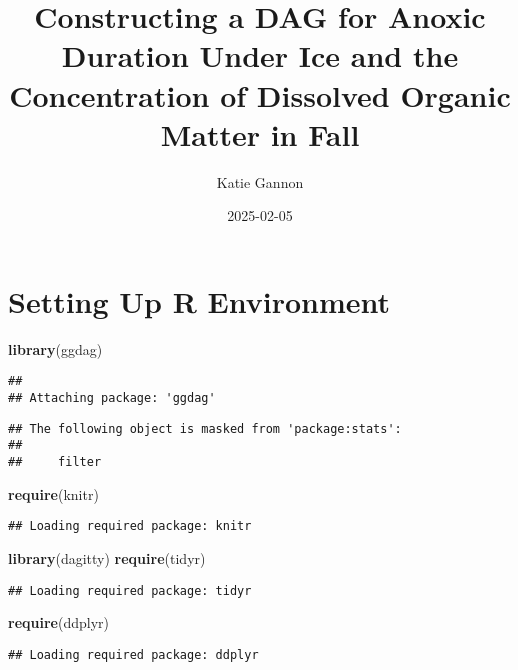 \documentclass[]{article}
\title{Constructing a DAG for Anoxic Duration Under Ice and the Concentration
of Dissolved Organic Matter in Fall}
\author{Katie Gannon}
\date{2025-02-05}
\newenvironment{Shaded}{\begin{snugshade}}{\end{snugshade}}
\newcommand{\KeywordTok}[1]{\textcolor[rgb]{0.13,0.29,0.53}{\textbf{#1}}}
\newcommand{\NormalTok}[1]{#1}
\begin{document}
\maketitle

\hypertarget{setting-up-r-environment}{%
\section{Setting Up R Environment}\label{setting-up-r-environment}}

\begin{Shaded}
\begin{Highlighting}[]
\KeywordTok{library}\NormalTok{(ggdag)}
\end{Highlighting}
\end{Shaded}

\begin{verbatim}
## 
## Attaching package: 'ggdag'
\end{verbatim}

\begin{verbatim}
## The following object is masked from 'package:stats':
## 
##     filter
\end{verbatim}

\begin{Shaded}
\begin{Highlighting}[]
\KeywordTok{require}\NormalTok{(knitr)}
\end{Highlighting}
\end{Shaded}

\begin{verbatim}
## Loading required package: knitr
\end{verbatim}

\begin{Shaded}
\begin{Highlighting}[]
\KeywordTok{library}\NormalTok{(dagitty)}
\KeywordTok{require}\NormalTok{(tidyr)}
\end{Highlighting}
\end{Shaded}

\begin{verbatim}
## Loading required package: tidyr
\end{verbatim}

\begin{Shaded}
\begin{Highlighting}[]
\KeywordTok{require}\NormalTok{(ddplyr)}
\end{Highlighting}
\end{Shaded}

\begin{verbatim}
## Loading required package: ddplyr
\end{verbatim}
\end{document}
